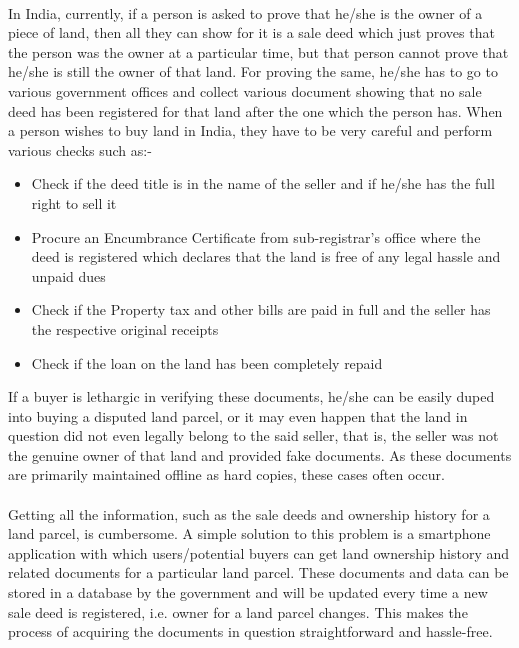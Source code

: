 \documentclass[12pt]{article}
\begin{document}
        \paragraph{}
        In India, currently, if a person is asked to prove that he/she is the owner of a piece of land, then all they can show for it is a sale deed which just proves that the person was the owner at a particular time, but that person cannot prove that he/she is still the owner of that land. For proving the same, he/she has to go to various government offices and collect various document showing that no sale deed has been registered for that land after the one which the person has. When a person wishes to buy land in India, they have to be very careful and perform various checks such as:-
        \begin{itemize}
            \item Check if the deed title is in the name of the seller and if he/she has the full right to sell it
            \item Procure an Encumbrance Certificate from sub-registrar's office where the deed is registered which declares that the land is free of any legal hassle and unpaid dues
            \item Check if the Property tax and other bills are paid in full and the seller has the respective original receipts
            \item Check if the loan on the land has been completely repaid
        \end{itemize}
        If a buyer is lethargic in verifying these documents, he/she can be easily duped into buying a disputed land parcel, or it may even happen that the land in question did not even legally belong to the said seller, that is, the seller was not the genuine owner of that land and provided fake documents. As these documents are primarily maintained offline as hard copies, these cases often occur.

        \paragraph{}
        Getting all the information, such as the sale deeds and ownership history for a land parcel, is cumbersome. A simple solution to this problem is a smartphone application with which users/potential buyers can get land ownership history and related documents for a particular land parcel. These documents and data can be stored in a database by the government and will be updated every time a new sale deed is registered, i.e. owner for a land parcel changes. This makes the process of acquiring the documents in question straightforward and hassle-free.
\end{document}
